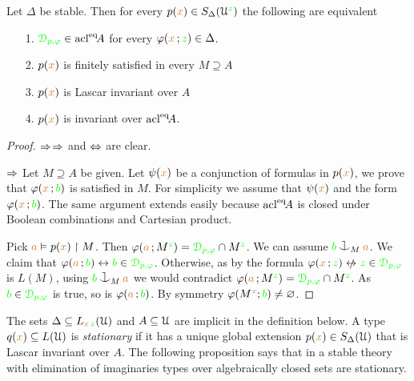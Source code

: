 \begin{proposition}\label{prop_type_over_acl2}
  Let $\Delta$ be stable.
  Then for every $p({\color{brown} x})\in S_\Delta(\EuScript U^{\color{green} z})$ the following are equivalent
  \begin{itemize}
  \item[1.] ${\color{green}\EuScript D_{p,\varphi}}\in {\rm acl}^{{\rm eq}}\!A$ for every $\varphi({\color{brown} x}\,;{\color{green} z})\in\Delta$.
  \item[2.] $p({\color{brown} x})$ is finitely satisfied in every $M\supseteq A$
  \item[3.] $p({\color{brown} x})$ is Lascar invariant over $A$
  \item[4.] $p({\color{brown} x})$ is invariant over ${\rm acl}^{{\rm eq}}\!A$.
  \end{itemize}
\end{proposition}
\begin{proof}
  $\Rightarrow$$\Rightarrow$ and $\Leftrightarrow$ are clear.

  $\Rightarrow$
  Let $M\supseteq A$ be given.
  Let $\psi({\color{brown} x})$ be a conjunction of formulas in $p({\color{brown} x})$, we prove that $\varphi({\color{brown} x}\,;{\color{green} b})$ is satisfied in $M$.
  For simplicity we assume that $\psi({\color{brown} x})$ and the form $\varphi({\color{brown} x}\,;{\color{green} b})$.
  The same argument extends easily because ${\rm acl}^{{\rm eq}}\!A$ is closed under Boolean combinations and Cartesian product.

  Pick ${\color{brown} a}\vDash p({\color{brown} x})\restriction M$.
  Then $\varphi({\color{brown} a}\,;M^{\color{green} z})={\color{green}\EuScript D_{p,\varphi}}\cap M^{\color{green} z}$.
  We can assume ${\gr b}\cnonfork_M{\mr a}$.
  We claim that $\varphi({\color{brown} a}\,;{\color{green} b})\leftrightarrow{\color{green}b}\in{\color{green}\EuScript D_{p,\varphi}}$.
  Otherwise, as by  the formula $\phi({\mr x}\,;{\gr z})\niff{\gr z}\in{\gr\D_{p,\phi}}$ is $L(M)$, using ${\gr b}\cnonfork_M{\mr a}$ we would contradict $\varphi({\color{brown} a}\,;M^{\color{green} z})={\color{green}\EuScript D_{p,\varphi}}\cap M^{\color{green} z}$.
  As ${\color{green} b}\in{\color{green}\EuScript D_{p,\varphi}}$ is true, so is $\varphi({\color{brown} a}\,;{\color{green} b})$.
  By symmetry $\varphi(M^{\color{brown} x};{\color{green} b})\neq\varnothing$.
\end{proof}

The sets $\Delta\subseteq L_{{\color{brown} x}\,{\color{green} z}}(\EuScript U)$ and $A\subseteq\EuScript U$ are implicit in the definition below.
A type $q({\color{brown} x})\subseteq L(\EuScript U)$ is \emph{stationary\/} if it has a unique global extension $p({\color{brown} x})\in S_\Delta(\EuScript U)$ that is Lascar invariant over $A$.
The following proposition says that in a stable theory with elimination of imaginaries types over algebraically closed sets are stationary.


